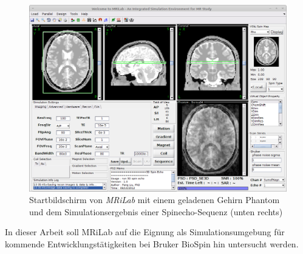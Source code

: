\begin{figure}[H]
	\centering
	\includegraphics[width=\textwidth]{img/mrilabScreenshot.png}
	\caption[MRiLab Startbildschirm]{Startbildschirm von \textit{MRiLab} mit einem geladenen Gehirn Phantom und dem Simulationsergebnis einer Spinecho-Sequenz (unten rechts)}
	\label{fig:mrilabscreenshot}
\end{figure}

In dieser Arbeit soll MRiLab auf die Eignung als Simulationsumgebung für kommende Entwicklungstätigkeiten bei Bruker BioSpin hin untersucht werden.


